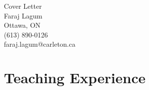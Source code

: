 \documentclass[11pt]{article}
\newcommand{\ignore}[1]{}
\begin{document}
\begin{center}
{\Large Cover Letter} \\[.3in]
{\large Faraj Lagum}\\
Ottawa, ON \\
(613) 890-0126 \\
faraj.lagum@carleton.ca \\

\ignore{
\vspace*{.5in}
{``\emph{Education is not the learning of facts, but the training of minds to think.}'' \\ ---Albert Einstein.}

}
\end{center}








\section{Teaching Experience}
\end{document}
